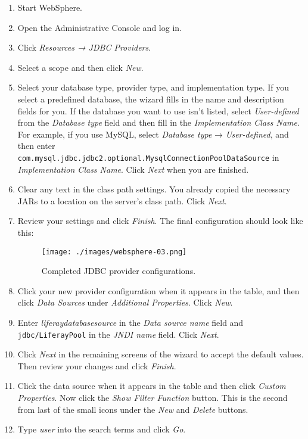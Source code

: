 \begin{enumerate}
\def\labelenumi{\arabic{enumi}.}
\item
  Start WebSphere.
\item
  Open the Administrative Console and log in.
\item
  Click \emph{Resources → JDBC Providers}.
\item
  Select a scope and then click \emph{New}.
\item
  Select your database type, provider type, and implementation type. If
  you select a predefined database, the wizard fills in the name and
  description fields for you. If the database you want to use isn't
  listed, select \emph{User-defined} from the \emph{Database type} field
  and then fill in the \emph{Implementation Class Name}. For example, if
  you use MySQL, select \emph{Database type} → \emph{User-defined}, and
  then enter
  \texttt{com.mysql.jdbc.jdbc2.optional.MysqlConnectionPoolDataSource}
  in \emph{Implementation Class Name}. Click \emph{Next} when you are
  finished.
\item
  Clear any text in the class path settings. You already copied the
  necessary JARs to a location on the server's class path. Click
  \emph{Next}.
\item
  Review your settings and click \emph{Finish}. The final configuration
  should look like this:

  \begin{figure}
  \centering
  \texttt{[image: ./images/websphere-03.png]}
  \caption{Completed JDBC provider configurations.}
  \end{figure}
\item
  Click your new provider configuration when it appears in the table,
  and then click \emph{Data Sources} under \emph{Additional Properties}.
  Click \emph{New}.
\item
  Enter \emph{liferaydatabasesource} in the \emph{Data source name}
  field and \texttt{jdbc/LiferayPool} in the \emph{JNDI name} field.
  Click \emph{Next}.
\item
  Click \emph{Next} in the remaining screens of the wizard to accept the
  default values. Then review your changes and click \emph{Finish}.
\item
  Click the data source when it appears in the table and then click
  \emph{Custom Properties}. Now click the \emph{Show Filter Function}
  button. This is the second from last of the small icons under the
  \emph{New} and \emph{Delete} buttons.
\item
  Type \emph{user} into the search terms and click \emph{Go}.


\end{enumerate}
